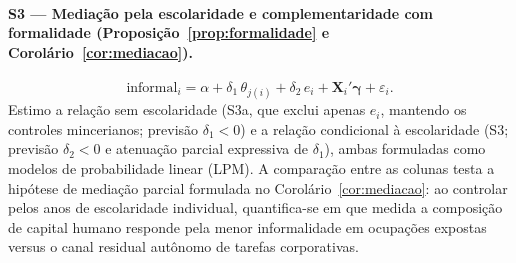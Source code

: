 \paragraph{S3 --- Mediação pela escolaridade e complementaridade com formalidade (Proposição~\ref{prop:formalidade} e Corolário~\ref{cor:mediacao}).}
\begin{equation}
    \text{informal}_i = \alpha + \delta_1 \, \theta_{j(i)} + \delta_2 \, e_i
    + \mathbf{X}_i' \boldsymbol{\gamma} + \varepsilon_i.
    \label{eq:s3}
\end{equation}
Estimo a relação sem escolaridade (S3a, que exclui apenas $e_i$, mantendo os controles mincerianos; previsão $\delta_1 < 0$) e a relação condicional à escolaridade (S3; previsão $\delta_2 < 0$ e atenuação parcial expressiva de $\delta_1$), ambas formuladas como modelos de probabilidade linear (LPM). A comparação entre as colunas testa a hipótese de mediação parcial formulada no Corolário~\ref{cor:mediacao}: ao controlar pelos anos de escolaridade individual, quantifica-se em que medida a composição de capital humano responde pela menor informalidade em ocupações expostas versus o canal residual autônomo de tarefas corporativas.
